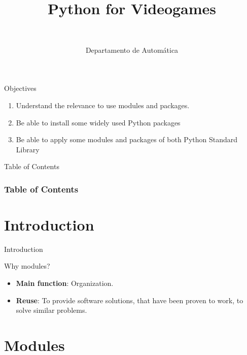 \documentclass[10pt,compress]{beamer} %
\title[Python]{Python for Videogames}
\author{\asignatura\\\carrera}
\institute{}
\date{Departamento de Automática}
\begin{document}
{\titlepageBlue
    \begin{frame}
        \titlepage
    \end{frame}
}

\institute{\asignatura}

\begin{frame}[plain]{}
	\begin{block}{Objectives}
		\begin{enumerate}
		\item Understand the relevance to use modules and packages.
		\item Be able to install some widely used Python packages%
		\item Be able to apply some modules and packages of both Python Standard Library%
		\end{enumerate}
	\end{block}
\end{frame}

{
\begin{frame}[shrink]{Table of Contents}
 \frametitle{Table of Contents}
 \tableofcontents
\end{frame}
}

\section{Introduction}
\begin{frame}{Introduction}
		\begin{block}{Why modules?}
			\begin{itemize}
			\item \textbf{Main function}: Organization.
			\item \textbf{Reuse}: To provide software solutions, that have been proven to work, to solve similar problems.
			\end{itemize}
		\end{block}
\end{frame}

\section{Modules}
\end{document}

